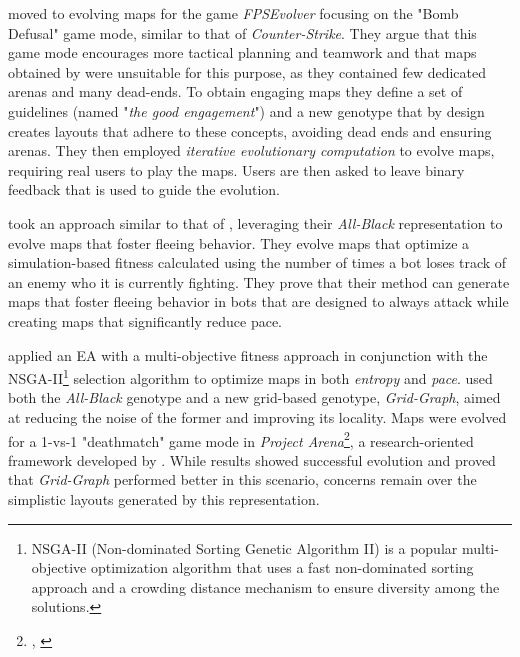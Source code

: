  moved to evolving maps for the game \textit{FPSEvolver} focusing on the "Bomb Defusal" game mode, similar to that of \textit{Counter-Strike}. They argue that this game mode encourages more tactical planning and teamwork and that maps obtained by  were unsuitable for this purpose, as they contained few dedicated arenas and many dead-ends. To obtain engaging maps they define a set of guidelines (named "\textit{the good engagement}") and a new genotype that by design creates layouts that adhere to these concepts, avoiding dead ends and ensuring arenas. They then employed \textit{iterative evolutionary computation} to evolve maps, requiring real users to play the maps. Users are then asked to leave binary feedback that is used to guide the evolution. \cite{olsted_interactive_2015}

 took an approach similar to that of , leveraging their \textit{All-Black} representation to evolve maps that foster fleeing behavior. They evolve maps that optimize a simulation-based fitness calculated using the number of times a bot loses track of an enemy who it is currently fighting. They prove that their method can generate maps that foster fleeing behavior in bots that are designed to always attack while creating maps that significantly reduce pace. \cite{loiacono_fight_2017}

\citeauthor{bari_evolutionary-based_2023} applied an EA with a multi-objective fitness approach in conjunction with the NSGA-II\footnote{NSGA-II (Non-dominated Sorting Genetic Algorithm II) is a popular multi-objective optimization algorithm that uses a fast non-dominated sorting approach and a crowding distance mechanism to ensure diversity among the solutions.} selection algorithm to optimize maps in both \textit{entropy} and \textit{pace}.  used both the \textit{All-Black} genotype and a new grid-based genotype, \textit{Grid-Graph}, aimed at reducing the noise of the former and improving its locality. Maps were evolved for a 1-vs-1 "deathmatch" game mode in \textit{Project Arena}\footnote{, \citeyear{ballabio_online_2018}}, a research-oriented framework developed by . While results showed successful evolution and proved that \textit{Grid-Graph} performed better in this scenario, concerns remain over the simplistic layouts generated by this representation. \cite{bari_evolutionary-based_2023}

